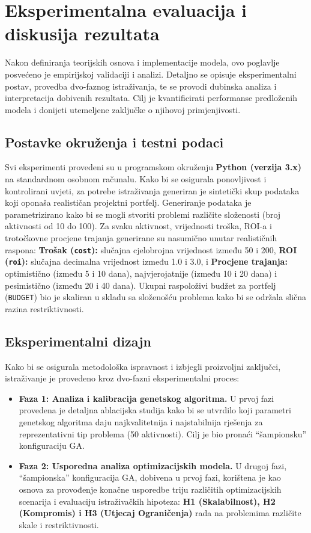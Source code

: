 \section{Eksperimentalna evaluacija i diskusija rezultata}
\label{chap:eksperimenti}
Nakon definiranja teorijskih osnova i implementacije modela, ovo poglavlje posvećeno je empirijskoj validaciji i analizi. Detaljno se opisuje eksperimentalni postav, provedba dvo-faznog istraživanja, te se provodi dubinska analiza i interpretacija dobivenih rezultata. Cilj je kvantificirati performanse predloženih modela i donijeti utemeljene zaključke o njihovoj primjenjivosti.

\subsection{Postavke okruženja i testni podaci}
Svi eksperimenti provedeni su u programskom okruženju \textbf{Python (verzija 3.x)} na standardnom osobnom računalu. Kako bi se osigurala ponovljivost i kontrolirani uvjeti, za potrebe istraživanja generiran je sintetički skup podataka koji oponaša realističan projektni portfelj.  Generiranje podataka je parametrizirano kako bi se mogli stvoriti problemi različite složenosti (broj aktivnosti od 10 do 100). Za svaku aktivnost, vrijednosti troška, ROI-a i trotočkovne procjene trajanja generirane su nasumično unutar realističnih raspona: \textbf{Trošak (\texttt{cost}):} slučajna cjelobrojna vrijednost između 50 i 200, \textbf{ROI (\texttt{roi}):} slučajna decimalna vrijednost između 1.0 i 3.0, i \textbf{Procjene trajanja:} optimistično (između 5 i 10 dana), najvjerojatnije (između 10 i 20 dana) i pesimistično (između 20 i 40 dana).
Ukupni raspoloživi budžet za portfelj (\texttt{BUDGET}) bio je skaliran u skladu sa složenošću problema kako bi se održala slična razina restriktivnosti.

\subsection{Eksperimentalni dizajn}
Kako bi se osigurala metodološka ispravnost i izbjegli proizvoljni zaključci, istraživanje je provedeno kroz dvo-fazni eksperimentalni proces:
\begin{itemize}
    \item \textbf{Faza 1: Analiza i kalibracija genetskog algoritma.} U prvoj fazi provedena je detaljna ablacijska studija kako bi se utvrdilo koji parametri genetskog algoritma daju najkvalitetnija i najstabilnija rješenja za reprezentativni tip problema (50 aktivnosti). Cilj je bio pronaći ``šampionsku'' konfiguraciju GA.
    \item \textbf{Faza 2: Usporedna analiza optimizacijskih modela.} U drugoj fazi, ``šampionska'' konfiguracija GA, dobivena u prvoj fazi, korištena je kao osnova za provođenje konačne usporedbe triju različitih optimizacijskih scenarija i evaluaciju istraživačkih hipoteza: \textbf{H1 (Skalabilnost), H2 (Kompromis) i H3 (Utjecaj Ograničenja)} rada na problemima različite skale i restriktivnosti.
\end{itemize}

